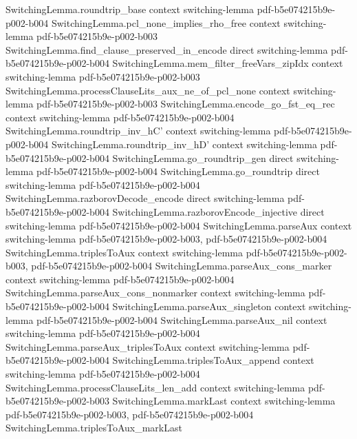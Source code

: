 \begin{theorem}
\proofstep
  {SwitchingLemma.roundtrip_base}
  {context}
  {switching-lemma}
  {pdf-b5e074215b9e-p002-b004}
\proofstep
  {SwitchingLemma.pcl_none_implies_rho_free}
  {context}
  {switching-lemma}
  {pdf-b5e074215b9e-p002-b003}
\proofstep
  {SwitchingLemma.find_clause_preserved_in_encode}
  {direct}
  {switching-lemma}
  {pdf-b5e074215b9e-p002-b004}
\proofstep
  {SwitchingLemma.mem_filter_freeVars_zipIdx}
  {context}
  {switching-lemma}
  {pdf-b5e074215b9e-p002-b003}
\proofstep
  {SwitchingLemma.processClauseLits_aux_ne_of_pcl_none}
  {context}
  {switching-lemma}
  {pdf-b5e074215b9e-p002-b003}
\proofstep
  {SwitchingLemma.encode_go_fst_eq_rec}
  {context}
  {switching-lemma}
  {pdf-b5e074215b9e-p002-b004}
\proofstep
  {SwitchingLemma.roundtrip_inv_hC'}
  {context}
  {switching-lemma}
  {pdf-b5e074215b9e-p002-b004}
\proofstep
  {SwitchingLemma.roundtrip_inv_hD'}
  {context}
  {switching-lemma}
  {pdf-b5e074215b9e-p002-b004}
\proofstep
  {SwitchingLemma.go_roundtrip_gen}
  {direct}
  {switching-lemma}
  {pdf-b5e074215b9e-p002-b004}
\proofstep
  {SwitchingLemma.go_roundtrip}
  {direct}
  {switching-lemma}
  {pdf-b5e074215b9e-p002-b004}
\proofstep
  {SwitchingLemma.razborovDecode_encode}
  {direct}
  {switching-lemma}
  {pdf-b5e074215b9e-p002-b004}
\proofstep
  {SwitchingLemma.razborovEncode_injective}
  {direct}
  {switching-lemma}
  {pdf-b5e074215b9e-p002-b004}
\proofstep
  {SwitchingLemma.parseAux}
  {context}
  {switching-lemma}
  {pdf-b5e074215b9e-p002-b003,
    pdf-b5e074215b9e-p002-b004}
\proofstep
  {SwitchingLemma.triplesToAux}
  {context}
  {switching-lemma}
  {pdf-b5e074215b9e-p002-b003,
    pdf-b5e074215b9e-p002-b004}
\proofstep
  {SwitchingLemma.parseAux_cons_marker}
  {context}
  {switching-lemma}
  {pdf-b5e074215b9e-p002-b004}
\proofstep
  {SwitchingLemma.parseAux_cons_nonmarker}
  {context}
  {switching-lemma}
  {pdf-b5e074215b9e-p002-b004}
\proofstep
  {SwitchingLemma.parseAux_singleton}
  {context}
  {switching-lemma}
  {pdf-b5e074215b9e-p002-b004}
\proofstep
  {SwitchingLemma.parseAux_nil}
  {context}
  {switching-lemma}
  {pdf-b5e074215b9e-p002-b004}
\proofstep
  {SwitchingLemma.parseAux_triplesToAux}
  {context}
  {switching-lemma}
  {pdf-b5e074215b9e-p002-b004}
\proofstep
  {SwitchingLemma.triplesToAux_append}
  {context}
  {switching-lemma}
  {pdf-b5e074215b9e-p002-b004}
\proofstep
  {SwitchingLemma.processClauseLits_len_add}
  {context}
  {switching-lemma}
  {pdf-b5e074215b9e-p002-b003}
\proofstep
  {SwitchingLemma.markLast}
  {context}
  {switching-lemma}
  {pdf-b5e074215b9e-p002-b003,
    pdf-b5e074215b9e-p002-b004}
\proofstep
  {SwitchingLemma.triplesToAux_markLast}

\end{theorem}
